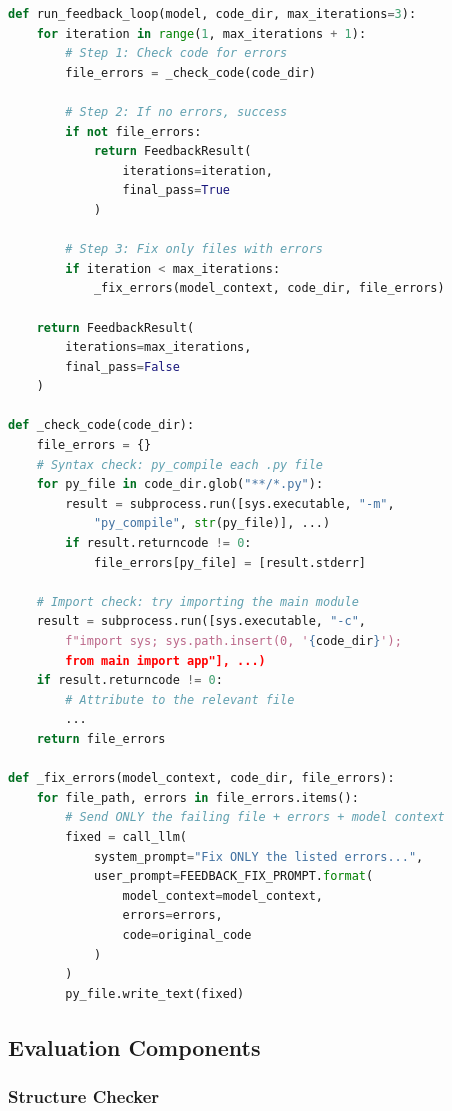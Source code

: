 \documentclass[11pt,a4paper]{article}
\begin{document}
\begin{lstlisting}[language=Python, caption={Bidirectional feedback algorithm}, label={alg:feedback}]
def run_feedback_loop(model, code_dir, max_iterations=3):
    for iteration in range(1, max_iterations + 1):
        # Step 1: Check code for errors
        file_errors = _check_code(code_dir)

        # Step 2: If no errors, success
        if not file_errors:
            return FeedbackResult(
                iterations=iteration,
                final_pass=True
            )

        # Step 3: Fix only files with errors
        if iteration < max_iterations:
            _fix_errors(model_context, code_dir, file_errors)

    return FeedbackResult(
        iterations=max_iterations,
        final_pass=False
    )

def _check_code(code_dir):
    file_errors = {}
    # Syntax check: py_compile each .py file
    for py_file in code_dir.glob("**/*.py"):
        result = subprocess.run([sys.executable, "-m",
            "py_compile", str(py_file)], ...)
        if result.returncode != 0:
            file_errors[py_file] = [result.stderr]

    # Import check: try importing the main module
    result = subprocess.run([sys.executable, "-c",
        f"import sys; sys.path.insert(0, '{code_dir}');
        from main import app"], ...)
    if result.returncode != 0:
        # Attribute to the relevant file
        ...
    return file_errors

def _fix_errors(model_context, code_dir, file_errors):
    for file_path, errors in file_errors.items():
        # Send ONLY the failing file + errors + model context
        fixed = call_llm(
            system_prompt="Fix ONLY the listed errors...",
            user_prompt=FEEDBACK_FIX_PROMPT.format(
                model_context=model_context,
                errors=errors,
                code=original_code
            )
        )
        py_file.write_text(fixed)
\end{lstlisting}

\subsection{Evaluation Components}

\subsubsection{Structure Checker}
\end{document}
